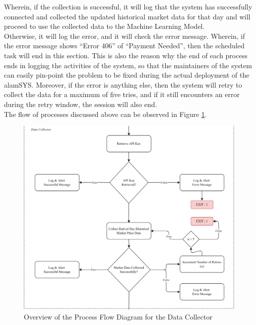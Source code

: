 Wherein, if the collection is successful, it will log that 
the system has successfully connected and collected the updated 
historical market data for that day and will proceed to use the 
collected data to the Machine Learning Model.
\hfill \\

Otherwise, it will log the error, and it will check the error message. 
Wherein, if the error message shows “Error 406” of “Payment Needed”, 
then the scheduled task will end in this section. This is also the reason why 
the end of each process ends in logging the activities of the system, so that 
the maintainers of the system can easily pin-point the problem to be fixed during 
the actual deployment of the alamSYS. Moreover, if the error is anything else, 
then the system will retry to collect the data for a maximum of five tries, and 
if it still encounters an error during the retry window, the session will also end.
\hfill \\

The flow of processes discussed above can be observed in Figure \ref{fig:process_flowchart_data_collector}.

\begin{figure}[ht]
    \centering
    \includegraphics[width=1\textwidth]{./assets/ProcessFlowchart_DataCollector.png}
    \caption{Overview of the Process Flow Diagram for the Data Collector}
    \label{fig:process_flowchart_data_collector}
\end{figure}
\FloatBarrier

